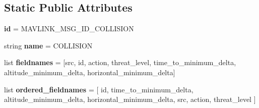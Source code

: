 \subsection*{Static Public Attributes}
\begin{DoxyCompactItemize}
\item 
\mbox{\label{classpymavlink_1_1dialects_1_1v10_1_1MAVLink__collision__message_a92e7db963c30200ee3814412b4d1e15c}} 
{\bfseries id} = M\+A\+V\+L\+I\+N\+K\+\_\+\+M\+S\+G\+\_\+\+I\+D\+\_\+\+C\+O\+L\+L\+I\+S\+I\+ON
\item 
\mbox{\label{classpymavlink_1_1dialects_1_1v10_1_1MAVLink__collision__message_a6d0deab43bf53fe6052717bfe98260f0}} 
string {\bfseries name} = \textquotesingle{}C\+O\+L\+L\+I\+S\+I\+ON\textquotesingle{}
\item 
\mbox{\label{classpymavlink_1_1dialects_1_1v10_1_1MAVLink__collision__message_ad9c7a2b3a709b426e58fa1ed147241a3}} 
list {\bfseries fieldnames} = \mbox{[}\textquotesingle{}src\textquotesingle{}, \textquotesingle{}id\textquotesingle{}, \textquotesingle{}action\textquotesingle{}, \textquotesingle{}threat\+\_\+level\textquotesingle{}, \textquotesingle{}time\+\_\+to\+\_\+minimum\+\_\+delta\textquotesingle{}, \textquotesingle{}altitude\+\_\+minimum\+\_\+delta\textquotesingle{}, \textquotesingle{}horizontal\+\_\+minimum\+\_\+delta\textquotesingle{}\mbox{]}
\item 
\mbox{\label{classpymavlink_1_1dialects_1_1v10_1_1MAVLink__collision__message_a1d473ebdad97758bfc079629b75dadc0}} 
list {\bfseries ordered\+\_\+fieldnames} = \mbox{[} \textquotesingle{}id\textquotesingle{}, \textquotesingle{}time\+\_\+to\+\_\+minimum\+\_\+delta\textquotesingle{}, \textquotesingle{}altitude\+\_\+minimum\+\_\+delta\textquotesingle{}, \textquotesingle{}horizontal\+\_\+minimum\+\_\+delta\textquotesingle{}, \textquotesingle{}src\textquotesingle{}, \textquotesingle{}action\textquotesingle{}, \textquotesingle{}threat\+\_\+level\textquotesingle{} \mbox{]}
\item 
\mbox{\label{classpymavlink_1_1dialects_1_1v10_1_1MAVLink__collision__message_a80eb635fb791b645a27e13f0ade632a4}} 

\end{DoxyCompactItemize}
